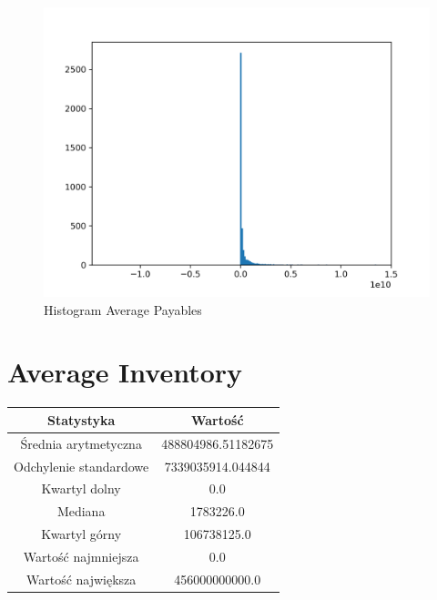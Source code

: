 \documentclass{article}
\begin{document}
\begin{figure}[h!]
    \includegraphics[width=\linewidth]{variables/Average Payables.png}
    \caption{Histogram Average Payables }
\end{figure}\section{ Average Inventory }

\begin{center}
    \begin{tabular}{|c | c|} 
    \hline
    Statystyka & Wartość \\
    \hline\hline
    Średnia arytmetyczna & 488804986.51182675 \\ 
    \hline
    Odchylenie standardowe & 7339035914.044844 \\
    \hline
    Kwartyl dolny & 0.0 \\
    \hline
    Mediana & 1783226.0 \\
    \hline
    Kwartyl górny & 106738125.0 \\
    \hline
    Wartość najmniejsza & 0.0 \\
    \hline
    Wartość największa & 456000000000.0 \\
    \hline
   \end{tabular}
\end{center}
\end{document}
